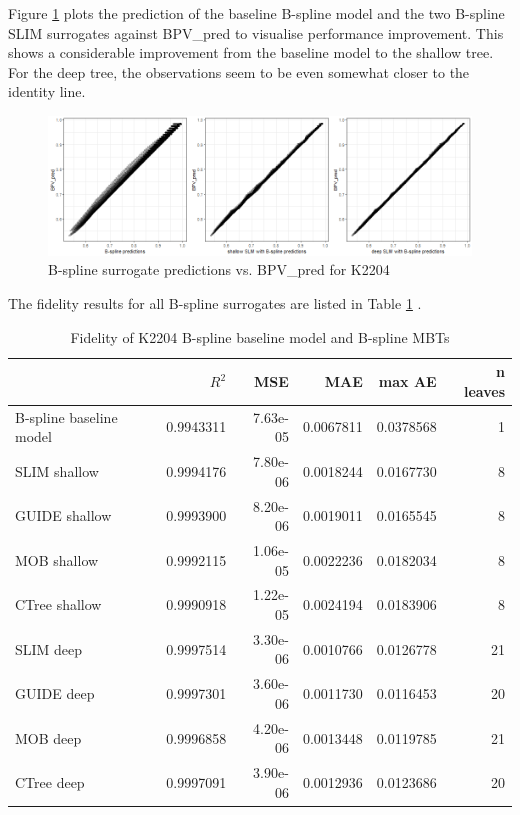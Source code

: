 Figure \ref{fig:ins_k2204_fit} plots the prediction of the baseline B-spline model and the two B-spline SLIM surrogates against BPV\_pred to visualise performance improvement. This shows a considerable improvement from the baseline model to the shallow tree. For the deep tree, the observations seem to be even somewhat closer to the identity line. 

\begin{figure}[!htb]
    \centering    
    \includegraphics[width = 14cm]{Figures/insurance_use_case/k2204_BPV/fit.png}
    \caption{B-spline surrogate predictions vs. BPV\_pred for K2204}
    \label{fig:ins_k2204_fit}
\end{figure}

The fidelity results for all B-spline surrogates are listed in Table \ref{tab:ins_k2204_bsplines_surrogates_perf} .

\begin{table}[!htb]
\centering \scriptsize
\begin{tabular}[t]{l|r|r|r|r|r}
\hline
  & $R^2$ & MSE & MAE & max AE & n leaves\\
\hline
B-spline baseline model & 0.9943311 & 7.63e-05 & 0.0067811 & 0.0378568 & 1\\
\hline
SLIM shallow & 0.9994176 & 7.80e-06 & 0.0018244 & 0.0167730 & 8\\
GUIDE shallow & 0.9993900 & 8.20e-06 & 0.0019011 & 0.0165545 & 8\\
MOB shallow & 0.9992115 & 1.06e-05 & 0.0022236 & 0.0182034 & 8\\
CTree shallow & 0.9990918 & 1.22e-05 & 0.0024194 & 0.0183906 & 8\\
\hline
SLIM deep & 0.9997514 & 3.30e-06 & 0.0010766 & 0.0126778 & 21\\
GUIDE deep & 0.9997301 & 3.60e-06 & 0.0011730 & 0.0116453 & 20\\
MOB deep & 0.9996858 & 4.20e-06 & 0.0013448 & 0.0119785 & 21\\
CTree deep & 0.9997091 & 3.90e-06 & 0.0012936 & 0.0123686 & 20\\
\hline
\end{tabular}
\caption{Fidelity of K2204 B-spline baseline model and  B-spline MBTs}
\label{tab:ins_k2204_bsplines_surrogates_perf}
\end{table}


